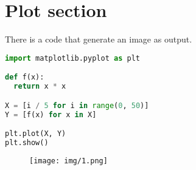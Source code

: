 \section{ Plot section}


There is a code that generate an image as output.



\begin{lstlisting}[language={Python},caption={}]
import matplotlib.pyplot as plt

def f(x):
  return x * x

X = [i / 5 for i in range(0, 50)]
Y = [f(x) for x in X]

plt.plot(X, Y)
plt.show()
\end{lstlisting}


\begin{figure}[h!]
  \centering
  \texttt{[image: img/1.png]}
  \caption{}
  \label{fig:1}
\end{figure}


